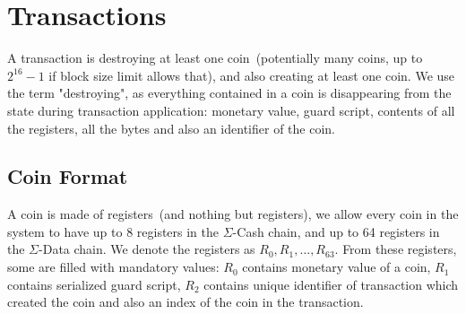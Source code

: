 \documentclass[]{article}   %
\newcommand{\ecash}{$\Sigma$-Cash}
\newcommand{\edata}{$\Sigma$-Data}
\newcommand{\coin}{coin}
\newcommand{\Coin}{Coin}
\begin{document}
%
%
%
%



\section{Transactions}


A transaction is destroying at least one \coin{}~(potentially many {\coin{}}s, up to $2^{16} - 1$ if block size
limit allows that), and also creating at least one \coin{}. We use the term "destroying", as everything contained
in a \coin{} is disappearing
from the state during transaction application: monetary value, guard script, contents of all the registers,
all the bytes and also an identifier of the \coin{}.

\subsection{\Coin{} Format}
\label{coin-format}

A \coin{} is made of registers~(and nothing but registers), we allow every \coin{} in the system to have up to 8 registers in the \ecash{} chain,
and up to 64 registers in the \edata{} chain. We denote the registers as $R_0,R_1,\ldots,R_{63}$.
From these registers, some are filled with mandatory values: $R_0$ contains monetary value of a \coin{}, $R_1$ contains
serialized guard script, $R_2$ contains unique identifier of transaction which created the coin and also an index of
the coin in the transaction.
\end{document}
